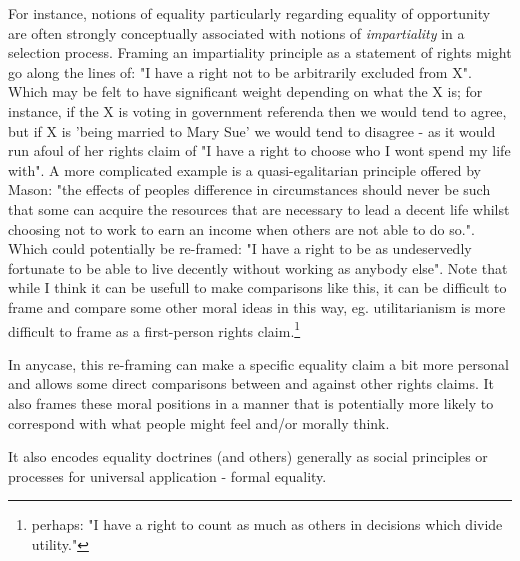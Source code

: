 For instance, notions of equality particularly regarding equality of opportunity are often strongly conceptually associated with notions of \textit{impartiality} in a selection process.
Framing an impartiality principle as a statement of rights might go along the lines of: "I have a right not to be arbitrarily excluded from X".
Which may be felt to have significant weight depending on what the X is; for instance, if the X is voting in government referenda then we would tend to agree, but if X is 'being married to Mary Sue' we would tend to disagree - as it would run afoul of her rights claim of "I have a right to choose who I wont spend my life with".
A more complicated example is a quasi-egalitarian principle offered by Mason: "the effects of peoples difference in circumstances should never be such that some can acquire the resources that are necessary to lead a decent life whilst choosing not to work to earn an income when others are not able to do so.". Which could potentially be re-framed: "I have a right to be as undeservedly fortunate to be able to live decently without working as anybody else".
Note that while I think it can be usefull to make comparisons like this, it can be difficult to frame and compare some other moral ideas in this way, eg. utilitarianism is more difficult to frame as a first-person rights claim.\footnote{perhaps: "I have a right to count as much as others in decisions which divide utility."}

In anycase, this re-framing can make a specific equality claim a bit more personal and allows some direct comparisons between and against other rights claims. It also frames these moral positions in a manner that is potentially more likely to correspond with what people might feel and/or morally think.

It also encodes equality doctrines (and others) generally as social principles or processes for universal application - formal equality.





